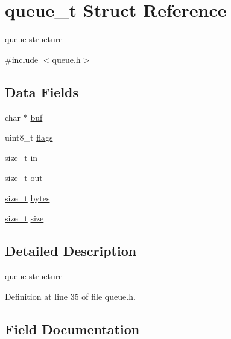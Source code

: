 \hypertarget{structqueue__t}{}\section{queue\+\_\+t Struct Reference}
\label{structqueue__t}


queue structure  




{\ttfamily \#include $<$queue.\+h$>$}

\subsection*{Data Fields}
\begin{DoxyCompactItemize}
\item 
char $\ast$ \hyperlink{structqueue__t_aaee81421d150a17123a2b858d5b1685d}{buf}
\item 
uint8\+\_\+t \hyperlink{structqueue__t_a2a516773a572c746d461c9df3cb30387}{flags}
\item 
\hyperlink{hardware_2user__config_8h_aea0c7eab1ce1eebb4e879ef4e23c16ee}{size\+\_\+t} \hyperlink{structqueue__t_a7a6832e36c70a1db7fddc93fb6be9d63}{in}
\item 
\hyperlink{hardware_2user__config_8h_aea0c7eab1ce1eebb4e879ef4e23c16ee}{size\+\_\+t} \hyperlink{structqueue__t_a8f6e1c623d2ceed398a71a0aab93b0fa}{out}
\item 
\hyperlink{hardware_2user__config_8h_aea0c7eab1ce1eebb4e879ef4e23c16ee}{size\+\_\+t} \hyperlink{structqueue__t_a58398d4ee60bc90ffba2bc3488fe185b}{bytes}
\item 
\hyperlink{hardware_2user__config_8h_aea0c7eab1ce1eebb4e879ef4e23c16ee}{size\+\_\+t} \hyperlink{structqueue__t_a83a13b888f9d4ef127d706559818b779}{size}
\end{DoxyCompactItemize}


\subsection{Detailed Description}
queue structure 

Definition at line 35 of file queue.\+h.



\subsection{Field Documentation}
\mbox{\label{structqueue__t_aaee81421d150a17123a2b858d5b1685d}} 
